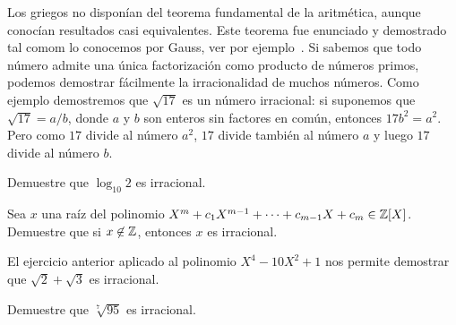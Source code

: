 Los griegos no disponían del teorema fundamental de la aritmética, aunque conocían resultados casi equivalentes. Este teorema
fue enunciado y demostrado tal comom lo conocemos por Gauss, ver por ejemplo~\cite{MR1277244,MR1849798,MR1163928,MR497463}. 
Si sabemos que todo número admite una única
factorización como producto de números primos, podemos demostrar fácilmente la
irracionalidad de muchos números. Como ejemplo demostremos que $\sqrt{17}$ es
un número irracional: si suponemos que $\sqrt{17}=a/b$, donde $a$ y $b$ son
enteros sin factores en común, entonces $17b^2=a^2$. Pero como $17$ divide al
número $a^2$, $17$ divide también al número $a$ y luego $17$ divide al número
$b$.

\begin{exercise}
	Demuestre que $\log_{10}2$ es irracional.
\end{exercise}

\begin{exercise}
	Sea $x$ una raíz del polinomio $X^m+c_1X^{m-1}+\cdots+c_{m-1}X+c_m\in\mathbb{Z}[X]$. 
	Demuestre que si $x\not\in\mathbb{Z}$, entonces $x$ es irracional. 
\end{exercise}


El ejercicio anterior aplicado al polinomio $X^4-10X^2+1$ 
nos permite demostrar que $\sqrt{2}+\sqrt{3}$ es irracional. 

\begin{exercise}
	Demuestre que $\sqrt[7]{95}$ es irracional.
\end{exercise}


